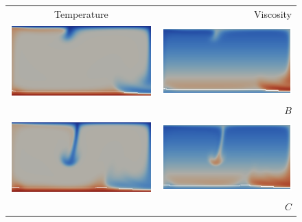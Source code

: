 \begin{figure}
  \centering
  \begin{tabular}{cr}
    Temperature & Viscosity \\
    \includegraphics[width=\twofigs]{chapters/vynnytska/png/tmB.png} &
    \includegraphics[width=\twofigs]{chapters/vynnytska/png/visB.png} \\& $B$ \\
    \includegraphics[width=\twofigs]{chapters/vynnytska/png/tmC.png} &
    \includegraphics[width=\twofigs]{chapters/vynnytska/png/visC.png} \\& $C$ \\

\end{tabular}
\end{figure}
